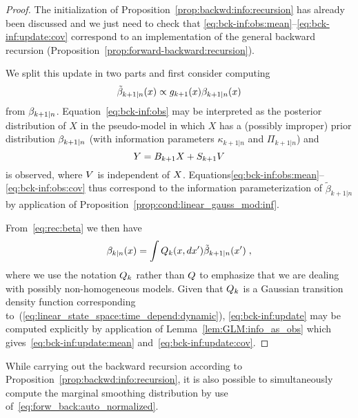 \begin{proof}
  The initialization of Proposition~\ref{prop:backwd:info:recursion} has
  already been discussed and we just need to check that
  \eqref{eq:bck-inf:obs:mean}--\eqref{eq:bck-inf:update:cov} correspond to an
  implementation of the general backward recursion
  (Proposition~\ref{prop:forward-backward:recursion}).

  We split this update in two parts and first consider computing
  \begin{equation}
   \label{eq:bck-inf:obs}
    \tilde{\beta}_{k+1|n}(x) \propto g_{k+1}(x) \beta_{k+1|n}(x)
  \end{equation}
  from $\beta_{k+1|n}$.
  Equation~\eqref{eq:bck-inf:obs} may be interpreted as the posterior distribution of $X$
  in the pseudo-model in which $X$ has a (possibly improper) prior distribution
  $\beta_{k+1|n}$ (with information parameters $\kappa_{k+1|n}$ and
  $\Pi_{k+1|n}$) and
  \[
    Y = B_{k+1} X + S_{k+1} V
  \]
  is observed, where $V$ is independent of $X$.
  Equations\eqref{eq:bck-inf:obs:mean}--\eqref{eq:bck-inf:obs:cov} thus correspond
  to the information parameterization of $\tilde{\beta}_{k+1|n}$ by
  application of Proposition~\ref{prop:cond:linear_gauss_mod:inf}.

  From~\eqref{eq:rec:beta} we then have
  \begin{equation}
   \label{eq:bck-inf:update}
    \beta_{k|n}(x) = \int Q_k(x,dx') \tilde{\beta}_{k+1|n}(x') \; ,
  \end{equation}
  where we use the notation $Q_k$ rather than $Q$ to emphasize that
  we are dealing with possibly non-homogeneous models. Given that $Q_k$ is a
  Gaussian transition density function corresponding
  to~(\ref{eq:linear_state_space:time_depend:dynamic}),
  \eqref{eq:bck-inf:update} may be computed explicitly by application of
  Lemma~\ref{lem:GLM:info_as_obs} which gives~\eqref{eq:bck-inf:update:mean}
  and~\eqref{eq:bck-inf:update:cov}.
\end{proof}

While carrying out the backward recursion according to
Proposition~\ref{prop:backwd:info:recursion}, it is also possible to
simultaneously compute the marginal smoothing distribution by use
of~\eqref{eq:forw_back:auto_normalized}.

